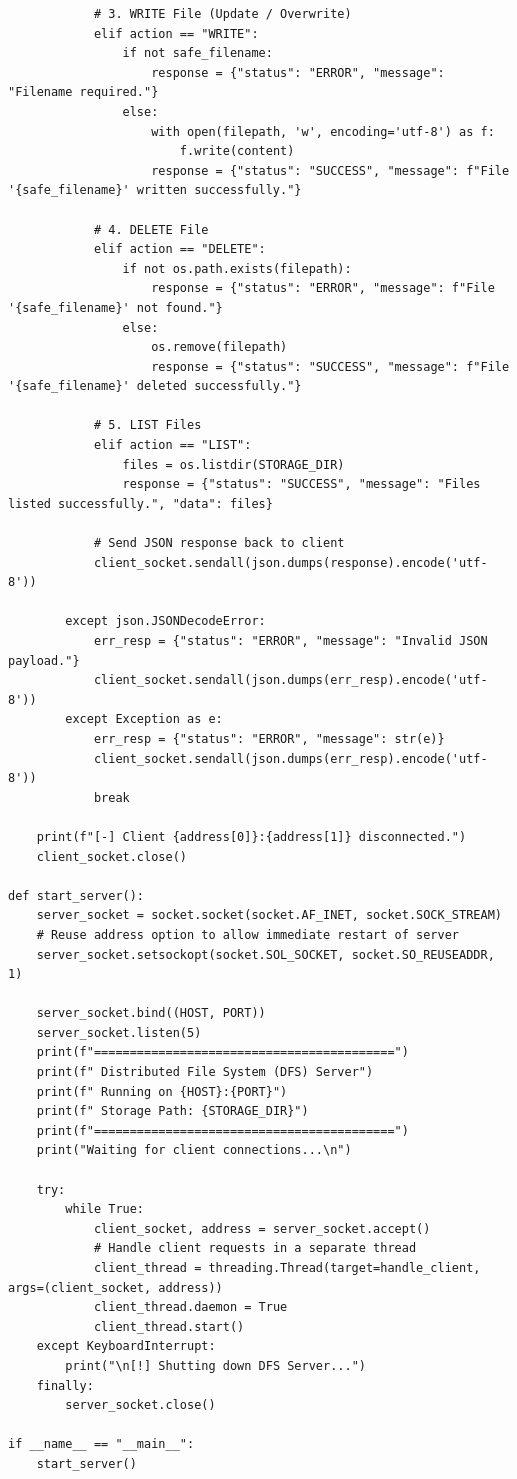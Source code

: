 \documentclass[main]{subfiles}
\begin{document}
\begin{verbatim}
            # 3. WRITE File (Update / Overwrite)
            elif action == "WRITE":
                if not safe_filename:
                    response = {"status": "ERROR", "message": "Filename required."}
                else:
                    with open(filepath, 'w', encoding='utf-8') as f:
                        f.write(content)
                    response = {"status": "SUCCESS", "message": f"File '{safe_filename}' written successfully."}

            # 4. DELETE File
            elif action == "DELETE":
                if not os.path.exists(filepath):
                    response = {"status": "ERROR", "message": f"File '{safe_filename}' not found."}
                else:
                    os.remove(filepath)
                    response = {"status": "SUCCESS", "message": f"File '{safe_filename}' deleted successfully."}

            # 5. LIST Files
            elif action == "LIST":
                files = os.listdir(STORAGE_DIR)
                response = {"status": "SUCCESS", "message": "Files listed successfully.", "data": files}

            # Send JSON response back to client
            client_socket.sendall(json.dumps(response).encode('utf-8'))

        except json.JSONDecodeError:
            err_resp = {"status": "ERROR", "message": "Invalid JSON payload."}
            client_socket.sendall(json.dumps(err_resp).encode('utf-8'))
        except Exception as e:
            err_resp = {"status": "ERROR", "message": str(e)}
            client_socket.sendall(json.dumps(err_resp).encode('utf-8'))
            break

    print(f"[-] Client {address[0]}:{address[1]} disconnected.")
    client_socket.close()

def start_server():
    server_socket = socket.socket(socket.AF_INET, socket.SOCK_STREAM)
    # Reuse address option to allow immediate restart of server
    server_socket.setsockopt(socket.SOL_SOCKET, socket.SO_REUSEADDR, 1)
    
    server_socket.bind((HOST, PORT))
    server_socket.listen(5)
    print(f"==========================================")
    print(f" Distributed File System (DFS) Server")
    print(f" Running on {HOST}:{PORT}")
    print(f" Storage Path: {STORAGE_DIR}")
    print(f"==========================================")
    print("Waiting for client connections...\n")

    try:
        while True:
            client_socket, address = server_socket.accept()
            # Handle client requests in a separate thread
            client_thread = threading.Thread(target=handle_client, args=(client_socket, address))
            client_thread.daemon = True
            client_thread.start()
    except KeyboardInterrupt:
        print("\n[!] Shutting down DFS Server...")
    finally:
        server_socket.close()

if __name__ == "__main__":
    start_server()
\end{verbatim}
\end{document}

